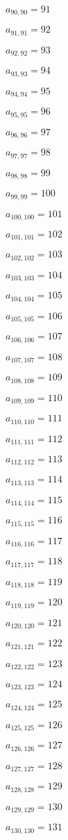 \documentclass[a4paper,12pt]{article}
\begin{document}
$a _{ 90, 90 } = 91$

$a _{ 91, 91 } = 92$

$a _{ 92, 92 } = 93$

$a _{ 93, 93 } = 94$

$a _{ 94, 94 } = 95$

$a _{ 95, 95 } = 96$

$a _{ 96, 96 } = 97$

$a _{ 97, 97 } = 98$

$a _{ 98, 98 } = 99$

$a _{ 99, 99 } = 100$

$a _{ 100, 100 } = 101$

$a _{ 101, 101 } = 102$

$a _{ 102, 102 } = 103$

$a _{ 103, 103 } = 104$

$a _{ 104, 104 } = 105$

$a _{ 105, 105 } = 106$

$a _{ 106, 106 } = 107$

$a _{ 107, 107 } = 108$

$a _{ 108, 108 } = 109$

$a _{ 109, 109 } = 110$

$a _{ 110, 110 } = 111$

$a _{ 111, 111 } = 112$

$a _{ 112, 112 } = 113$

$a _{ 113, 113 } = 114$

$a _{ 114, 114 } = 115$

$a _{ 115, 115 } = 116$

$a _{ 116, 116 } = 117$

$a _{ 117, 117 } = 118$

$a _{ 118, 118 } = 119$

$a _{ 119, 119 } = 120$

$a _{ 120, 120 } = 121$

$a _{ 121, 121 } = 122$

$a _{ 122, 122 } = 123$

$a _{ 123, 123 } = 124$

$a _{ 124, 124 } = 125$

$a _{ 125, 125 } = 126$

$a _{ 126, 126 } = 127$

$a _{ 127, 127 } = 128$

$a _{ 128, 128 } = 129$

$a _{ 129, 129 } = 130$

$a _{ 130, 130 } = 131$
\end{document}
